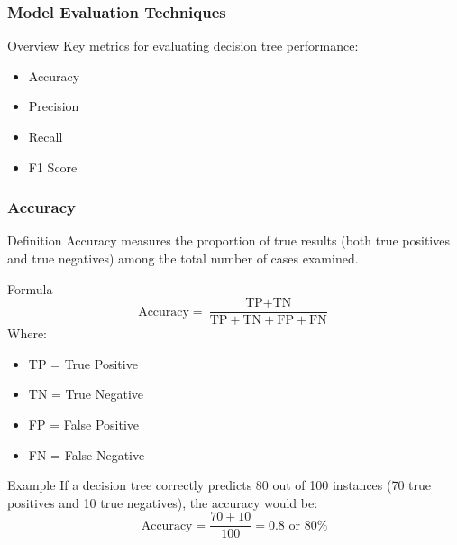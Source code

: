 \documentclass[aspectratio=169]{beamer}
\begin{document}
\begin{frame}[fragile]
    \frametitle{Model Evaluation Techniques}
    \begin{block}{Overview}
        Key metrics for evaluating decision tree performance:
        \begin{itemize}
            \item Accuracy
            \item Precision
            \item Recall
            \item F1 Score
        \end{itemize}
    \end{block}
\end{frame}

\begin{frame}[fragile]
    \frametitle{Accuracy}
    \begin{block}{Definition}
        Accuracy measures the proportion of true results (both true positives and true negatives) among the total number of cases examined.
    \end{block}
    \begin{block}{Formula}
        \begin{equation}
        \text{Accuracy} = \frac{\text{TP} + \text{TN}}{\text{TP} + \text{TN} + \text{FP} + \text{FN}}
        \end{equation}
        Where:
        \begin{itemize}
            \item TP = True Positive
            \item TN = True Negative
            \item FP = False Positive
            \item FN = False Negative
        \end{itemize}
    \end{block}
    \begin{block}{Example}
        If a decision tree correctly predicts 80 out of 100 instances (70 true positives and 10 true negatives), the accuracy would be:
        \begin{equation}
        \text{Accuracy} = \frac{70 + 10}{100} = 0.8 \text{ or } 80\%
        \end{equation}
    \end{block}
\end{frame}
\end{document}
